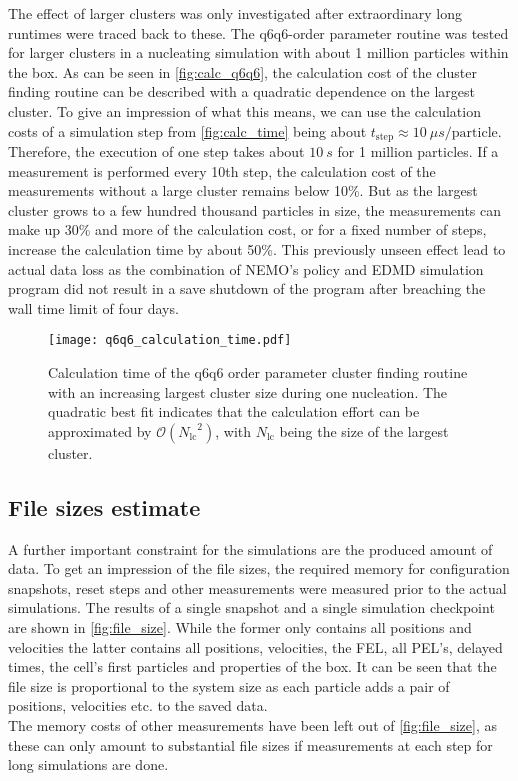 The effect of larger clusters was only investigated after extraordinary long runtimes were traced back to these. The q6q6-order parameter routine was tested for larger clusters in a nucleating simulation with about 1 million particles within the box. As can be seen in \autoref{fig:calc_q6q6}, the calculation cost of the cluster finding routine can be described with a quadratic dependence on the largest cluster. To give an impression of what this means, we can use the calculation costs of a simulation step from \autoref{fig:calc_time} being about $t_{\text{step}} \approx \SI{10}{\mu s \per \text{particle} }$. Therefore, the execution of one step takes about $\SI{10}{s}$ for 1 million particles. If a measurement is performed every 10th step, the calculation cost of the measurements without a large cluster remains below 10\%. But as the largest cluster grows to a few hundred thousand particles in size, the measurements can make up 30\% and more of the calculation cost, or for a fixed number of steps, increase the calculation time by about 50\%. This previously unseen effect lead to actual data loss as the combination of NEMO's policy and EDMD simulation program did not result in a save shutdown of the program after breaching the wall time limit of four days.

\begin{figure}[h!]
\centering
\texttt{[image: q6q6\_calculation\_time.pdf]}
\caption[Quadratic calculation time of q6q6-order parameter cluster finding routine]{Calculation time of the q6q6 order parameter cluster finding routine with an increasing largest cluster size during one nucleation. The quadratic best fit indicates that the calculation effort can be approximated by $\mathcal{O}({N_{\text{lc}}}^2)$, with $N_{\text{lc}}$ being the size of the largest cluster.}
\label{fig:calc_q6q6}
\end{figure}

\subsection{File sizes estimate}
\label{sec:file_size}
A further important constraint for the simulations are the produced amount of data. To get an impression of the file sizes, the required memory for configuration snapshots, reset steps and other measurements were measured prior to the actual simulations. The results of a single snapshot and a single simulation checkpoint are shown in \autoref{fig:file_size}. While the former only contains all positions and velocities the latter contains all positions, velocities, the FEL, all PEL's, delayed times, the cell's first particles and properties of the box. It can be seen that the file size is proportional to the system size as each particle adds a pair of positions, velocities etc. to the saved data.\\
The memory costs of other measurements have been left out of \autoref{fig:file_size}, as these can only amount to substantial file sizes if measurements at each step for long simulations are done. 

